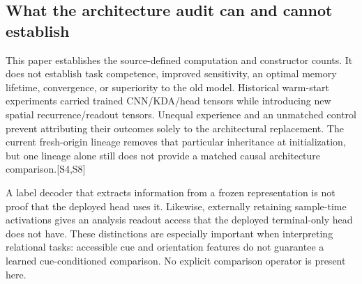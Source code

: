 \documentclass[10pt,letterpaper]{article}
\newcommand{\src}[1]{\textcolor{accent}{\textsf{[#1]}}}
\begin{document}
\subsection{What the architecture audit can and cannot establish}
This paper establishes the source-defined computation and constructor counts. It does not establish task competence, improved sensitivity, an optimal memory lifetime, convergence, or superiority to the old model. Historical warm-start experiments carried trained CNN/KDA/head tensors while introducing new spatial recurrence/readout tensors. Unequal experience and an unmatched control prevent attributing their outcomes solely to the architectural replacement. The current fresh-origin lineage removes that particular inheritance at initialization, but one lineage alone still does not provide a matched causal architecture comparison.\src{S4,S8}

A label decoder that extracts information from a frozen representation is not proof that the deployed head uses it. Likewise, externally retaining sample-time activations gives an analysis readout access that the deployed terminal-only head does not have. These distinctions are especially important when interpreting relational tasks: accessible cue and orientation features do not guarantee a learned cue-conditioned comparison. No explicit comparison operator is present here.
\end{document}
